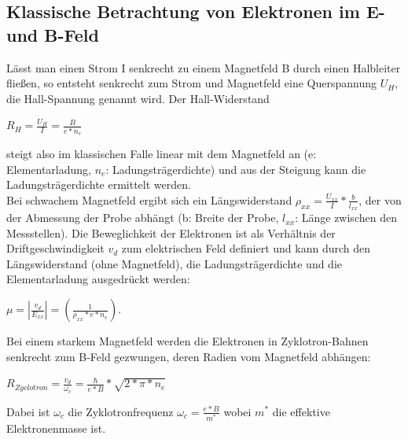 \documentclass[10pt,a4paper]{article}
\begin{document}
\subsection*{Klassische Betrachtung von Elektronen im E- und B-Feld}
Lässt man einen Strom I senkrecht zu einem Magnetfeld B durch einen Halbleiter fließen, so entsteht senkrecht zum Strom und Magnetfeld eine Querspannung $ U_H $, die Hall-Spannung genannt wird. Der Hall-Widerstand \begin{center}
$ R_H=\frac{U_H}{I}=\frac{B}{e*n_e}$
\end{center} 
steigt also im klassischen Falle linear mit dem Magnetfeld an (e: Elementarladung, $ n_e$: Ladungsträgerdichte) und aus der Steigung kann die Ladungsträgerdichte ermittelt werden.\\
Bei schwachem Magnetfeld ergibt sich ein Längswiderstand $ \rho _{xx}=\frac{U_{xx}}{I}*\frac{b}{l_{xx}} $, der von der Abmessung der Probe abhängt (b: Breite der Probe, $ l_{xx}$: Länge zwischen den Messstellen). Die Beweglichkeit der Elektronen ist als Verhältnis der Driftgeschwindigkeit $ v_d $ zum elektrischen Feld definiert und kann durch den Längswiderstand (ohne Magnetfeld), die Ladungsträgerdichte und die Elementarladung ausgedrückt werden:
\begin{center}
$\mu=|\frac{v_d}{E_{xx}}| =\left(\frac{1}{\rho _{xx}*e*n_e}\right) $.\\
\end{center} 
Bei einem starkem Magnetfeld werden die Elektronen in Zyklotron-Bahnen senkrecht zum B-Feld gezwungen, deren Radien vom Magnetfeld abhängen: 
\begin{center} 
$ R_{Zyclotron}=\frac{v_d}{\omega _c}=\frac{\hbar}{e*B}*\sqrt{2*\pi*n_e} $ 
\end{center} 
Dabei ist $\omega_c $ die Zyklotronfrequenz $ \omega _c=\frac{e*B}{m^*} $ wobei $ m^* $ die effektive Elektronenmasse ist.
\end{document}
